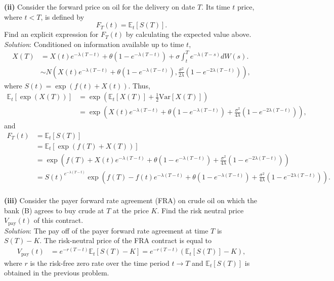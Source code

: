 \documentclass[paper=a4, fontsize=11pt]{scrartcl} %
\numberwithin{equation}{section} %
\numberwithin{figure}{section} %
\numberwithin{table}{section} %
\begin{document}
\textbf{(ii)} Consider the forward price on oil for the delivery on date $T$. Its time $t$ price, where $t<T$, is defined by
$$
F_T(t) = \mathbb{E}_t\left[S(T)\right].
$$
Find an explicit expression for $F_T(t)$ by calculating the expected value above.\\
\textit{Solution}: Conditioned on information available up to time $t$,
\begin{align*}
X(T) &= X(t)e^{-\lambda(T-t)}+ \theta \left( 1- e^{-\lambda (T-t)} \right)+ \sigma \int_t^T e^{-\lambda (T - s)}dW(s).\\
&\sim N\left( X(t)e^{-\lambda(T-t)}+ \theta \left( 1- e^{-\lambda (T-t)} \right), \frac{\sigma^2}{2\lambda}\left( 1 - e^{-2\lambda (T-t)} \right) \right),
\end{align*}
where $S(t) = \exp\left( f(t) + X(t) \right)$. Thus,
\begin{align*}
\mathbb{E}_t \left[\exp\left(  X(T) \right)\right] &= \exp\left(\mathbb{E}_t \left[ X(T)\right] + \frac{1}{2}\text{Var}\left[ X(T)\right]\right)\\
&= \exp\left( X(t)e^{-\lambda(T-t)}+ \theta \left( 1- e^{-\lambda (T-t)} \right) + \frac{\sigma^2}{4\lambda}\left( 1 - e^{-2\lambda (T-t)} \right)\right),
\end{align*}
and
\begin{align}
\nonumber F_T(t) &= \mathbb{E}_t\left[S(T)\right]\\
\nonumber &= \mathbb{E}_t\left[\exp\left(f(T) + X(T)\right)\right]\\
\label{ft}&= \exp\left( f(T) + X(t)e^{-\lambda(T-t)}+ \theta \left( 1- e^{-\lambda (T-t)} \right) + \frac{\sigma^2}{4\lambda}\left( 1 - e^{-2\lambda (T-t)} \right)\right)\\
\nonumber &= S(t)^{e^{-\lambda(T-t)}}\exp\left( f(T) - f(t)e^{-\lambda(T-t)}+ \theta \left( 1- e^{-\lambda (T-t)} \right) + \frac{\sigma^2}{4\lambda}\left( 1 - e^{-2\lambda (T-t)} \right)\right).
\end{align}\\

\textbf{(iii)} Consider the payer forward rate agreement (FRA) on crude oil on which the bank (B) agrees to buy crude at $T$ at the price $K$. Find
the risk neutral price $V_{\text{pay}}(t)$ of this contract.\\
\textit{Solution}: The pay off of the payer forward rate agreement at time $T$ is $S(T)-K$. The risk-neutral price of the FRA contract 
is equal to
\begin{align*}
V_{\text{pay}}(t) &= e^{-r(T-t)}\mathbb{E}_t\left[ S(T) - K \right]  = e^{-r(T-t)}\left(\mathbb{E}_t\left[ S(T) \right] - K\right),
\end{align*}
where $r$ is the risk-free zero rate over the time period $t\rightarrow T$ and $\mathbb{E}_t\left[S(T)\right]$
is obtained in the previous problem.\\
\end{document}
